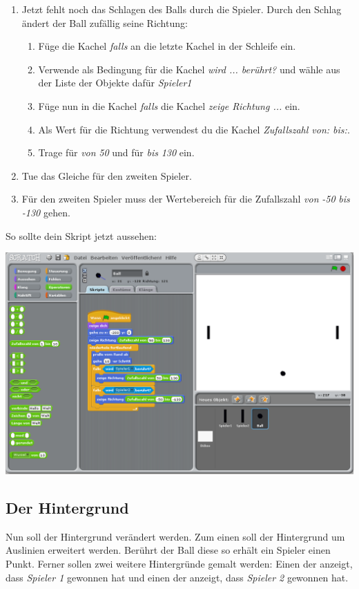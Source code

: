 \begin{enumerate}
\begin{enumerate}
\item Jetzt fehlt noch das Schlagen des Balls durch die Spieler. Durch den Schlag ändert der Ball zufällig seine Richtung:
\begin{enumerate}
\item Füge die Kachel \textit{falls} an die letzte Kachel in der Schleife ein.
\item Verwende als Bedingung für die Kachel \textit{wird ... berührt?} und wähle aus der Liste der Objekte dafür \emph{Spieler1}
\item Füge nun in die Kachel \textit{falls} die Kachel \textit{zeige Richtung ...} ein.
\item Als Wert für die Richtung verwendest du die Kachel \textit{Zufallszahl von: bis:}.
\item Trage für \emph{von} \emph{50} und für \emph{bis} \emph{130} ein.
\end{enumerate}
\item Tue das Gleiche für den zweiten Spieler.
\item Für den zweiten Spieler muss der Wertebereich für die Zufallszahl \emph{von} \emph{-50}  \emph{bis} \emph{-130} gehen. 
\end{enumerate}
\end{enumerate}

So sollte dein Skript jetzt aussehen: 

\includegraphics[width=1\textwidth]{images/aufgabe5_pong_sprite_ball_1.png}


\subsection{Der Hintergrund}
Nun soll der Hintergrund verändert werden. Zum einen soll der Hintergrund um Auslinien erweitert werden. Berührt der Ball diese so erhält ein Spieler einen Punkt. Ferner sollen zwei weitere Hintergründe gemalt werden: Einen der anzeigt, dass \textit{Spieler 1} gewonnen hat und  einen  der anzeigt, dass \textit{Spieler 2} gewonnen hat.

